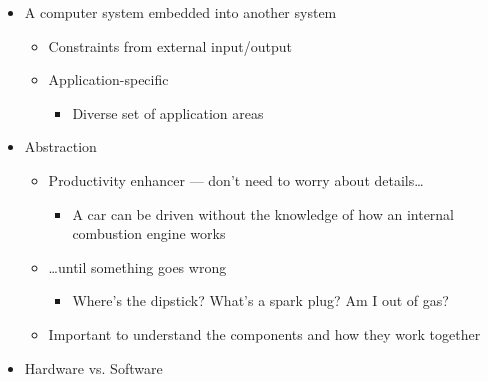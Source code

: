 \begin{itemize}

  \item A computer system embedded into another system

    \begin{itemize} 

      \item Constraints from external input/output 

      \item Application-specific

        \begin{itemize} 

          \item Diverse set of application areas

        \end{itemize}

    \end{itemize}

  \item Abstraction

    \begin{itemize}

      \item Productivity enhancer — don't need to worry about details\ldots

        \begin{itemize}

          \item A car can be driven without the knowledge of how an internal combustion engine works

        \end{itemize}

      \item \ldots until something goes wrong

        \begin{itemize}

          \item Where's the dipstick? What's a spark plug? Am I out of gas?

        \end{itemize}

      \item Important to understand the components and how they work together

    \end{itemize}

  \item Hardware vs. Software


\end{itemize}
